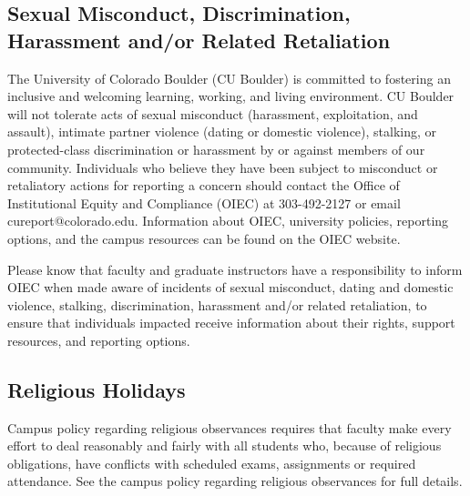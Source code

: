 \documentclass[9pt]{article}
\begin{document}
{\subsection*{Sexual Misconduct, Discrimination, Harassment and/or Related Retaliation}
The University of Colorado Boulder (CU Boulder) is committed to fostering an inclusive and welcoming learning, working, and living environment. CU Boulder will not tolerate acts of sexual misconduct (harassment, exploitation, and assault), intimate partner violence (dating or domestic violence), stalking, or protected-class discrimination or harassment by or against members of our community. Individuals who believe they have been subject to misconduct or retaliatory actions for reporting a concern should contact the Office of Institutional Equity and Compliance (OIEC) at 303-492-2127 or email cureport@colorado.edu. Information about OIEC, university policies, reporting options, and the campus resources can be found on the OIEC website.

Please know that faculty and graduate instructors have a responsibility to inform OIEC when made aware of incidents of sexual misconduct, dating and domestic violence, stalking, discrimination, harassment and/or related retaliation, to ensure that individuals impacted receive information about their rights, support resources, and reporting options.

\subsection*{Religious Holidays}
Campus policy regarding religious observances requires that faculty make every effort to deal reasonably and fairly with all students who, because of religious obligations, have conflicts with scheduled exams, assignments or required attendance.  
See the campus policy regarding religious observances for full details.

}
\end{document}
